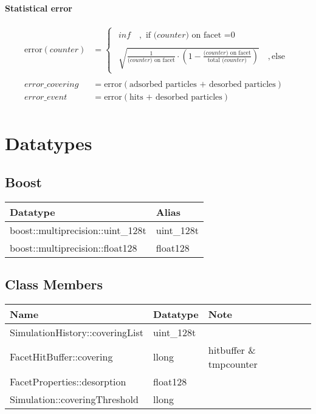 \subsubsection*{Statistical error}
\begin{equation}
	\label{eq:error}
	\begin{split}
	\text{error}(counter)&=
	\begin{cases}
	\begin{split}
		inf\quad,\text{ if ($counter$) on facet =0}\\
		\\
		 \sqrt{\frac{1}{\text{($counter$) on facet}} \cdot \left(1 - \frac{\text{($counter$) on facet}}{\text{total ($counter$)}}\right)}\quad,\text{else}
	\end{split}
	\end{cases}\\\\
	error\_covering&=\text{error}(\text{adsorbed particles + desorbed particles})\\
	error\_event&=\text{error}(\text{hits + desorbed particles})\\
	\end{split}
\end{equation}

\chapter{Datatypes}
\section{Boost}
\begin{center}
\begin{tabular}{|l|l|}
\hline
Datatype&Alias\\
\hline
boost::multiprecision::uint\_128t&uint\_128t\\
boost::multiprecision::float128&float128\\
\hline
\end{tabular}
\end{center}

\section{Class Members}
\begin{center}
\begin{tabular}{|l|l|l|l|}
\hline
Name&Datatype&Note\\
\hline
SimulationHistory::coveringList&uint\_128t&\\
FacetHitBuffer::covering&llong&hitbuffer \& tmpcounter\\
FacetProperties::desorption&float128&\\
Simulation::coveringThreshold&llong&\\
\hline
\end{tabular}
\end{center}
